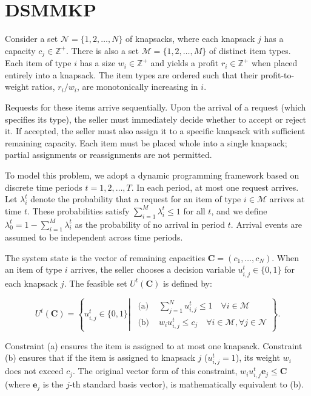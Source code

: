 \section{DSMMKP}\label{sec_dynamic_seat}
Consider a set $\mathcal{N} = \{1, 2, \ldots, N\}$ of knapsacks, where each knapsack $j$ has a capacity $c_j \in \mathbb{Z}^{+}$. There is also a set $\mathcal{M} = \{1, 2, \ldots, M\}$ of distinct item types. Each item of type $i$ has a size $w_i \in \mathbb{Z}^{+}$ and yields a profit $r_i \in \mathbb{Z}^{+}$ when placed entirely into a knapsack. The item types are ordered such that their profit-to-weight ratios, $r_i / w_i$, are monotonically increasing in $i$.

Requests for these items arrive sequentially. Upon the arrival of a request (which specifies its type), the seller must immediately decide whether to accept or reject it. If accepted, the seller must also assign it to a specific knapsack with sufficient remaining capacity. Each item must be placed whole into a single knapsack; partial assignments or reassignments are not permitted.


To model this problem, we adopt a dynamic programming framework based on discrete time periods $t = 1, 2, \ldots, T$. In each period, at most one request arrives. Let $\lambda_i^t$ denote the probability that a request for an item of type $i \in \mathcal{M}$ arrives at time $t$. These probabilities satisfy $\sum_{i=1}^M \lambda_i^t \leq 1$ for all $t$, and we define $\lambda_0^t = 1 - \sum_{i=1}^M \lambda_i^t$ as the probability of no arrival in period $t$. Arrival events are assumed to be independent across time periods.


The system state is the vector of remaining capacities $\mathbf{C} = (c_1, \ldots, c_N)$. When an item of type $i$ arrives, the seller chooses a decision variable $u_{i,j}^t \in \{0,1\}$ for each knapsack $j$. The feasible set $U^t(\mathbf{C})$ is defined by:

$$
U^t(\mathbf{C})=\left\{u_{i, j}^t \in\{0,1\} \left\lvert\, \begin{array}{ll}
\text { (a) } & \sum_{j=1}^N u_{i, j}^t \leq 1 \quad \forall i \in \mathcal{M} \\
\text { (b) } & w_i u_{i, j}^t \leq c_j \quad \forall i \in \mathcal{M}, \forall j \in \mathcal{N}
\end{array}\right.\right\} .
$$

Constraint (a) ensures the item is assigned to at most one knapsack. Constraint (b) ensures that if the item is assigned to knapsack $j$ ($u_{i,j}^t=1$), its weight $w_i$ does not exceed $c_j$. The original vector form of this constraint, $w_{i}u_{i,j}^{t}\mathbf{e}_j \leq \mathbf{C}$ (where $\mathbf{e}_j$ is the $j$-th standard basis vector), is mathematically equivalent to (b).




